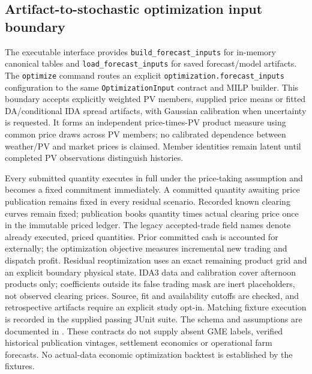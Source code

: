 \documentclass[11pt,a4paper]{article}
\begin{document}
\subsection{Artifact-to-stochastic optimization input boundary}
The executable  interface provides \texttt{build\_forecast\_inputs} for in-memory canonical tables and \texttt{load\_forecast\_inputs} for saved forecast/model artifacts. The \texttt{optimize} command routes an explicit \texttt{optimization.forecast\_inputs} configuration to the same \texttt{OptimizationInput} contract and MILP builder. This boundary accepts explicitly weighted PV members, supplied price means or fitted DA/conditional IDA spread artifacts, with Gaussian calibration when uncertainty is requested. It forms an independent price-times-PV product measure using common price draws across PV members; no calibrated dependence between weather/PV and market prices is claimed. Member identities remain latent until completed PV observations distinguish histories.

Every submitted quantity executes in full under the price-taking assumption and becomes a fixed commitment immediately. A committed quantity awaiting price publication remains fixed in every residual scenario. Recorded known clearing curves remain fixed; publication books quantity times actual clearing price once in the immutable priced ledger. The legacy accepted-trade field names denote already executed, priced quantities. Prior committed cash is accounted for externally; the optimization objective measures incremental new trading and dispatch profit. Residual reoptimization uses an exact remaining product grid and an explicit boundary physical state. IDA3 data and calibration cover afternoon products only; coefficients outside its false trading mask are inert placeholders, not observed clearing prices. Source, fit and availability cutoffs are checked, and retrospective artifacts require an explicit study opt-in. Matching fixture execution is recorded in the supplied passing JUnit suite. The schema and assumptions are documented in . These contracts do not supply absent GME labels, verified historical publication vintages, settlement economics or operational farm forecasts. No actual-data economic optimization backtest is established by the fixtures.
\end{document}
